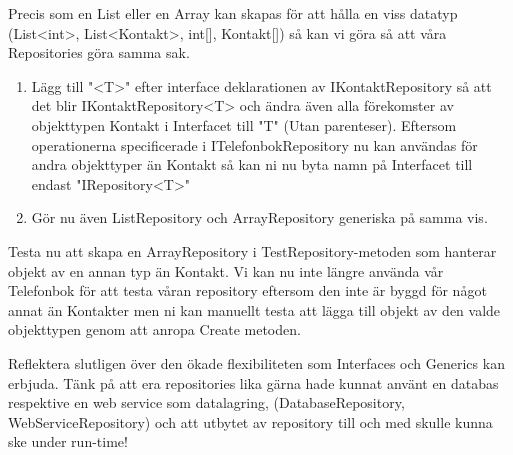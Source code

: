 \documentclass{article}
\begin{document}
Precis som en List eller en Array kan skapas för att hålla en viss datatyp
(List<int>, List<Kontakt>, int[], Kontakt[]) så kan vi göra så att våra Repositories göra samma sak.

    \begin{enumerate}
                 \item Lägg till "<T>" efter interface deklarationen av IKontaktRepository så att det blir IKontaktRepository<T> och ändra även alla förekomster av objekttypen Kontakt i Interfacet till "T" (Utan parenteser). Eftersom operationerna specificerade i ITelefonbokRepository nu kan användas för andra objekttyper än Kontakt så kan ni nu byta namn på Interfacet till endast "IRepository<T>"
    	              \item Gör nu även ListRepository och ArrayRepository generiska på samma vis.
     \end{enumerate}

Testa nu att  skapa en ArrayRepository i TestRepository-metoden som hanterar objekt av en annan typ än Kontakt. Vi kan nu inte längre använda vår Telefonbok för att testa våran repository eftersom den inte är byggd för något annat än Kontakter men ni kan manuellt testa att lägga till objekt av den valde objekttypen genom att anropa Create metoden.

Reflektera slutligen över den ökade flexibiliteten som Interfaces och Generics kan erbjuda. Tänk på att era repositories lika gärna hade kunnat använt en databas respektive en web service som datalagring, (DatabaseRepository, WebServiceRepository) och att utbytet av repository till och med skulle kunna ske under run-time!
\end{document}
